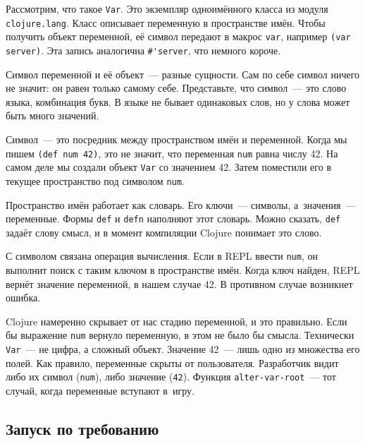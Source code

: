 
Рассмотрим, что такое \verb|Var|. Это экземпляр одноимённого класса из модуля
\verb|clojure.lang|. Класс описывает переменную в пространстве имён.  Чтобы
получить объект переменной, её символ передают в макрос \verb|var|, например
\verb|(var server)|. Эта запись аналогична \verb|#'server|, что немного короче.



Символ переменной и её объект~--- разные сущности. Сам по себе
символ ничего не значит: он равен только самому себе. Представьте, что символ~---
это слово языка, комбинация букв. В языке не бывает одинаковых слов, но у
слова может быть много значений.


Символ~--- это посредник между пространством имён и переменной. Когда мы пишем
\verb|(def num 42)|, это не значит, что переменная \verb|num| равна числу
42. На самом деле мы создали объект \verb|Var| со значением 42. Затем
поместили его в текущее пространство под символом \verb|num|.

Пространство имён работает как словарь. Его ключи~--- символы, а~значения~---
переменные. Формы \verb|def| и \verb|defn| наполняют этот словарь. Можно
сказать, \verb|def| задаёт слову смысл, и в момент компиляции Clojure
понимает это слово.

С символом связана операция вычисления. Если в REPL ввести \verb|num|,
он выполнит поиск с таким ключом в пространстве имён. Когда ключ найден, REPL
вернёт значение переменной, в нашем случае 42. В противном случае возникнет
ошибка.

Clojure намеренно скрывает от нас стадию переменной, и это правильно. Если бы
выражение \verb|num| вернуло переменную, в этом не было бы смысла. Технически
\verb|Var|~--- не цифра, а сложный объект. Значение 42~--- лишь одно из
множества его полей. Как правило, переменные скрыты от пользователя. Разработчик
видит либо их символ (\verb|num|), либо значение (\verb|42|). Функция
\verb|alter-var-root|~--- тот случай, когда переменные вступают в~игру.

\ifafive\vspace{20mm}\fi

\subsection{Запуск по требованию}

